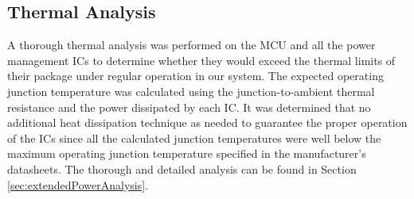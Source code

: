 \subsection{Thermal Analysis}
A thorough thermal analysis was performed on the MCU and all the power management ICs to determine whether they would exceed the thermal limits of their package under regular operation in our system.  The expected operating junction temperature was calculated using the junction-to-ambient thermal resistance and the power dissipated by each IC.  It was determined that no additional heat dissipation technique as needed to guarantee the proper operation of the ICs since all the calculated junction temperatures were well below the maximum operating junction temperature specified in the manufacturer's datasheets.  The thorough and detailed analysis can be found in Section \ref{sec:extendedPowerAnalysis}.


